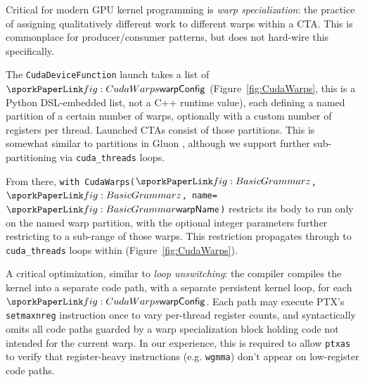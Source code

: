
Critical for modern GPU kernel programming is \emph{warp specialization}:
the practice of assigning qualitatively different work to different warps within a CTA.
This is commonplace for producer/consumer patterns, but \sporkName{} does not hard-wire this specifically.

The \texttt{CudaDeviceFunction} launch takes a list of $\sporkwarpConfig$
(Figure~\ref{fig:CudaWarps}, this is a Python DSL-embedded list, not a C++ runtime value),
each defining a named partition of a certain number of warps,
optionally with a custom number of registers per thread.
Launched CTAs consist of those partitions.
This is somewhat similar to partitions in Gluon \cite{gluon_warp_specialize},
although we support further sub-partitioning via \texttt{cuda\_threads} loops.

From there, \texttt{with CudaWarps($\sporkz$, $\sporkz$, name=$\sporkwarpName$)}
restricts its body to run only on the named warp partition,
with the optional integer parameters further restricting to a sub-range of those warps.
This restriction propagates through to \texttt{cuda\_threads} loops within (Figure~\ref{fig:CudaWarps}).



A critical optimization, similar to \emph{loop unswitching}:
the \sporkName{} compiler compiles the kernel into a separate code path,
with a separate persistent kernel loop,
for each $\sporkwarpConfig$.
Each path may execute PTX's \texttt{setmaxnreg} instruction once to vary per-thread register counts,
and syntactically omits all code paths guarded by a warp specialization block holding code not intended for the current warp.
In our experience, this is required to allow \texttt{ptxas} to verify that register-heavy instructions
(e.g. \texttt{wgmma}) don't appear on low-register code paths.


